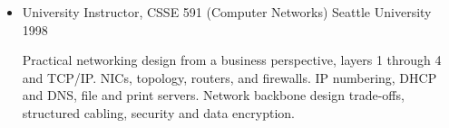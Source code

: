 \begin{itemize}
    \vspace{-2mm}
	\item University Instructor, CSSE 591 (Computer Networks) \hfill Seattle University \hfill 1998
        \vspace{-2mm}
        \begin{myquote}
            Practical networking design from a business perspective, layers
            1 through 4 and TCP/IP. NICs, topology, routers, and firewalls.
            IP numbering, DHCP and DNS, file and print servers. Network
            backbone design trade-offs, structured cabling, security and data
            encryption.
        \end{myquote}
\end{itemize}

